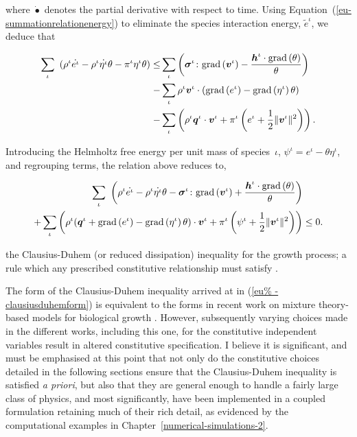 \noindent where $\dot{\bullet}$ denotes the partial derivative with
respect to time. Using Equation~(\ref{eu-summationrelationenergy}) to
eliminate the species interaction energy, $\tilde{e}^{\iota}$, we
deduce that

\begin{equation*}
\begin{split}
\sum\limits_{\iota}\ \left(\rho^{\iota} \dot{e^{\iota}} - \rho^{\iota}
\dot{\eta^{\iota}} \theta - \pi^{\iota}\eta^{\iota}\theta \right) \leq
& \sum\limits_{\iota} \left(
\mbox{\boldmath$\sigma$}^{\iota}\colon\mathrm{grad}\left(\mbox{\boldmath$ v$}^{\iota}\right) -
\frac{\mbox{\boldmath$ h$}^{\iota}\cdot\mathrm{grad}\left(\theta\right)}{\theta}
\right)\ \\ -& \sum\limits_{\iota} \rho^{\iota}\mbox{\boldmath$ v$}^{\iota} \cdot\left(
\mathrm{grad} \left(e^{\iota}\right) - \mathrm{grad}\left(\eta^{\iota}
\right)\theta\right) \\ -& \sum\limits_{\iota} \left(
\rho^{\iota}\mbox{\boldmath$ q$}^{\iota}\cdot\mbox{\boldmath$ v$}^{\iota} + \pi^{\iota} \left(e^\iota +
\frac{1}{2} \Vert\mbox{\boldmath$ v$}^\iota\Vert^2\right) \right).
\end{split}
\end{equation*}

Introducing the Helmholtz free energy per unit mass of
species~$\iota$, \mbox{$\psi^\iota = e^\iota - \theta\eta^\iota$}, and
regrouping terms, the relation above reduces to,

\begin{equation}
\begin{split}
\sum\limits_{\iota}\ \bigg(\rho^{\iota} \dot{e^{\iota}} - \rho^{\iota}
\dot{\eta^{\iota}} \theta
-\mbox{\boldmath$\sigma$}^{\iota}\colon\mathrm{grad}\left(\mbox{\boldmath$ v$}^{\iota}\right) +
\frac{\mbox{\boldmath$ h$}^{\iota}\cdot\mathrm{grad}\left(\theta\right)}{\theta} \bigg)
& \\ + \sum\limits_{\iota} \left( \rho^{\iota}
(\mbox{\boldmath$ q$}^{\iota}+\mathrm{grad} \left(e^{\iota}\right) -
\mathrm{grad}\left(\eta^{\iota} \right)\theta) \cdot\mbox{\boldmath$ v$}^{\iota} +
\pi^{\iota} \left(\psi^{\iota}+\frac{1}{2}
\Vert\mbox{\boldmath$ v$}^\iota\Vert^2\right) \right) & \leq 0.
\end{split}
\label{eu-clausiusduhemform}
\end{equation}

\noindent the Clausius-Duhem (or reduced dissipation) inequality for
the growth process; a rule which any prescribed constitutive
relationship must satisfy \citep{TruesdellToupin:60}.

The form of the Clausius-Duhem inequality arrived at in (\ref{eu%
-clausiusduhemform}) is equivalent to the forms in recent work
on mixture theory-based models for biological growth \citep{loret05,
  ateshian07}. However, subsequently varying choices made in the
different works, including this one, for the constitutive independent
variables result in altered constitutive specification. I believe it
is significant, and must be emphasised at this point that not only do the
constitutive choices detailed in the following sections ensure that
the Clausius-Duhem inequality is satisfied {\em a priori}, but also
that they are general enough to handle a fairly large class of
physics, and most significantly, have been implemented in a coupled
formulation retaining much of their rich detail, as evidenced by the
computational examples in Chapter~\ref{numerical-simulations-2}.

